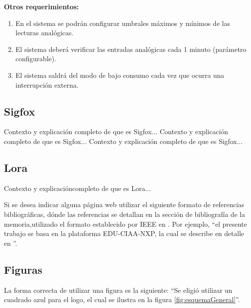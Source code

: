 \textbf{Otros requerimientos:}

\begin{enumerate}

	\item En el sistema se podrán configurar umbrales máximos y mínimos de las lecturas analógicas.

	\item El sistema deberá verificar las entradas analógicas cada 1 minuto (parámetro configurable).

	\item El sistema saldrá del modo de bajo consumo cada vez que ocurra una interrupción externa.

\end{enumerate}



\subsection{Sigfox}
Contexto y explicación  completo de que es Sigfox...
Contexto y explicación  completo de que es Sigfox...
Contexto y explicación  completo de que es Sigfox...
\subsection{Lora}
Contexto y explicacióncompleto de que es Lora...


Si se desea indicar alguna página web utilizar el siguiente formato de referencias bibliográficas, dónde las referencias se detallan en la sección de bibliografía de la memoria,utilizado el formato establecido por IEEE en \citep{IEEE:citation}. Por ejemplo, ``el presente trabajo se basa en la plataforma EDU-CIAA-NXP, la cual se describe en detalle en \citep{CIAA}''.

\subsection{Figuras} 

La forma correcta de utilizar una figura es la siguiente: ``Se eligió utilizar un cuadrado azul para el logo, el cual se ilustra en la figura \ref{fig:esquemaGeneral}''.


